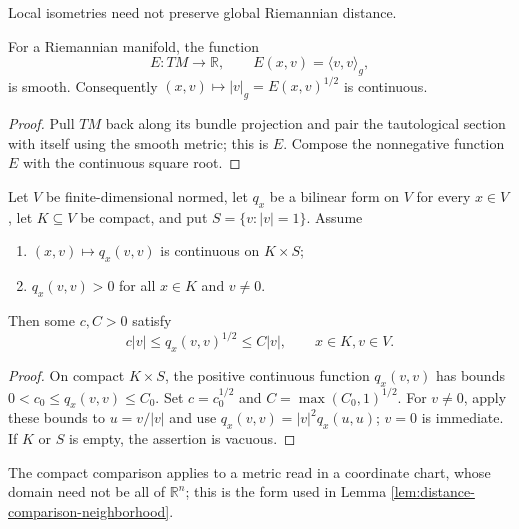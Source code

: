 Local isometries need not preserve global Riemannian distance.

\begin{lemma}
\label{lem:metric-energy-smooth}
\leanok
{}
For a Riemannian manifold, the function
\[
E:TM\to\mathbb R,\qquad E(x,v)=\langle v,v\rangle_g,
\]
is smooth. Consequently $(x,v)\mapsto|v|_g=E(x,v)^{1/2}$ is continuous.
\end{lemma}
\begin{proof}
\leanok
{}
\sketch Pull $TM$ back along its bundle projection and pair the tautological section with itself using the smooth metric; this is $E$. Compose the nonnegative function $E$ with the continuous square root.
\end{proof}

\begin{lemma}
\label{lem:norm-comparison-compact-core}
\leanok
Let $V$ be finite-dimensional normed, let $q_x$ be a bilinear form on $V$ for every $x\in V$, let $K\subseteq V$ be compact, and put $S=\{v:|v|=1\}$. Assume
\begin{enumerate}
\item[(i)] $(x,v)\mapsto q_x(v,v)$ is continuous on $K\times S$;
\item[(ii)] $q_x(v,v)>0$ for all $x\in K$ and $v\ne0$.
\end{enumerate}
Then some $c,C>0$ satisfy
\[
c|v|\le q_x(v,v)^{1/2}\le C|v|,
\qquad x\in K, v\in V.
\]
\end{lemma}
\begin{proof}
\leanok
\sketch On compact $K\times S$, the positive continuous function $q_x(v,v)$ has bounds $0<c_0\le q_x(v,v)\le C_0$. Set $c=c_0^{1/2}$ and $C=\max(C_0,1)^{1/2}$. For $v\ne0$, apply these bounds to $u=v/|v|$ and use $q_x(v,v)=|v|^2q_x(u,u)$; $v=0$ is immediate. If $K$ or $S$ is empty, the assertion is vacuous.
\end{proof}

The compact comparison applies to a metric read in a coordinate chart, whose domain need not be all of $\mathbb R^n$; this is the form used in Lemma \ref{lem:distance-comparison-neighborhood}.

